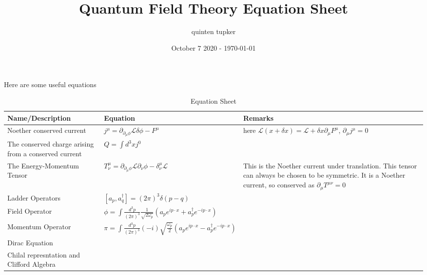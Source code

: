 \documentclass{article}
\title{Quantum Field Theory Equation Sheet}
\author{quinten tupker}
\date{October 7 2020 - \today}
\theoremstyle{definition}
\begin{document}
\maketitle

Here are some useful equations

\begin{table}[H]
  \caption{Equation Sheet}
  \begin{adjustbox}{center}
    \begin{tabular}{|p{5cm}|p{10cm}|p{5cm}|}
      \hline
      \label{equations_1}
      Name/Description & Equation & Remarks \\ \hline
      Noether conserved current & $j^\mu = \partial_{\partial_\mu \phi} \mathcal{L} \delta \phi - F^\mu$ & here $\mathcal{L}(x + \delta x) = \mathcal{L} + \delta x \partial_\mu F^\mu$, $\partial_\mu j^\mu = 0$ \\ \hline
      The conserved charge arising from a conserved current & $Q = \int d^3x j^0$ & \\ \hline
      The Energy-Momentum Tensor & $T^\mu_\nu = \partial_{\partial_\mu \phi} \mathcal{L} \partial_\nu \phi - \delta^\mu_\nu \mathcal{L}$ & This is the Noether current under translation. This tensor can always be chosen to be symmetric. It is a Noether current, so conserved as $\partial_\mu T^{\mu \nu} = 0$ \\ \hline
      Ladder Operators & $[a_p, a_q^\dagger] = (2\pi)^3 \delta(p - q)$ & \\ \hline
      Field Operator & $\phi = \int \frac{d^3p}{(2\pi)^3} \frac{1}{\sqrt{2\omega_p}} (a_p e^{i p \cdot x} + a_p^\dagger e^{-i p \cdot x})$ & \\ \hline
      Momentum Operator & $\pi = \int \frac{d^3p}{(2\pi)^3} (-i) \sqrt{\frac{\omega_p}{2}} (a_p e^{i p \cdot x} - a_p^\dagger e^{-ip \cdot x})$ & \\ \hline
      Dirac Equation & & & \\ \hline
      Chilal represntation and Clifford Algebra & & & \\ \hline
    \end{tabular}
  \end{adjustbox}
\end{table}
\end{document}

